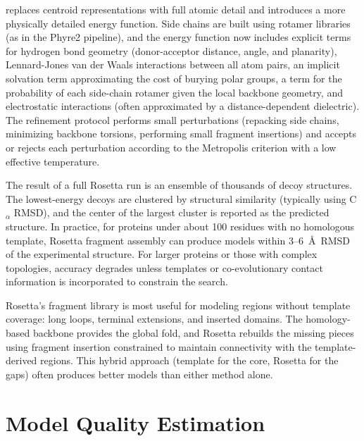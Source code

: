  replaces centroid representations with full atomic detail and introduces a more physically detailed energy function. Side chains are built using rotamer libraries (as in the Phyre2 pipeline), and the energy function now includes explicit terms for hydrogen bond geometry (donor-acceptor distance, angle, and planarity), Lennard-Jones van der Waals interactions between all atom pairs, an implicit solvation term approximating the cost of burying polar groups, a term for the probability of each side-chain rotamer given the local backbone geometry, and electrostatic interactions (often approximated by a distance-dependent dielectric). The refinement protocol performs small perturbations (repacking side chains, minimizing backbone torsions, performing small fragment insertions) and accepts or rejects each perturbation according to the Metropolis criterion with a low effective temperature.

The result of a full Rosetta run is an ensemble of thousands of decoy structures. The lowest-energy decoys are clustered by structural similarity (typically using C$_\alpha$ RMSD), and the center of the largest cluster is reported as the predicted structure. In practice, for proteins under about 100 residues with no homologous template, Rosetta fragment assembly can produce models within 3--6~\AA\ RMSD of the experimental structure. For larger proteins or those with complex topologies, accuracy degrades unless templates or co-evolutionary contact information is incorporated to constrain the search.

 Rosetta's fragment library is most useful for modeling regions without template coverage: long loops, terminal extensions, and inserted domains. The homology-based backbone provides the global fold, and Rosetta rebuilds the missing pieces using fragment insertion constrained to maintain connectivity with the template-derived regions. This hybrid approach (template for the core, Rosetta for the gaps) often produces better models than either method alone.

\section{Model Quality Estimation}
\label{sec:quality-estimation}

